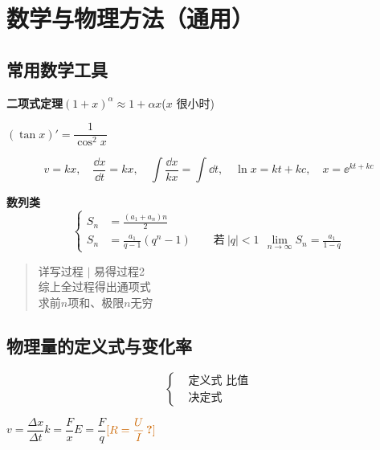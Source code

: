 \chapter{数学与物理方法（通用）}
\label{ch:90}

\section{常用数学工具}
\textbf{二项式定理}\quad $(1+x)^{\alpha}\approx 1+\alpha x$\quad ($x$ 很小时)

$(\tan x)'=\dfrac{1}{\cos^2 x}$


\[
v=kx,\quad \frac{\dd x}{\dd t}=kx,\quad \int\frac{\dd x}{kx}=\int\dd t,\quad \ln x=kt+kc,\quad x=\ee^{kt+kc}
\]

\textbf{数列类}
\[
\left\{\begin{aligned}
S_n&=\frac{(a_1+a_n)n}{2}\\
S_n&=\frac{a_1}{q-1}(q^{n}-1)\qquad \text{若}\ |q|<1\ \ \lim_{n\to\infty}S_n=\frac{a_1}{1-q}
\end{aligned}\right.
\]
\begin{quote}
详写过程 $|$ 易得过程2\\
综上全过程得出通项式\\
求前$n$项和、极限$n$无穷
\end{quote}


\section{物理量的定义式与变化率}
\[
\left\{\begin{aligned}
&\text{定义式\ \ 比值}\\[8pt]
&\text{决定式}
\end{aligned}\right.
\]

$v=\dfrac{\Delta x}{\Delta t}$\quad $k=\dfrac{F}{x}$\quad $E=\dfrac{F}{q}$\quad $\unclear{R=\dfrac{U}{I}}$ %

